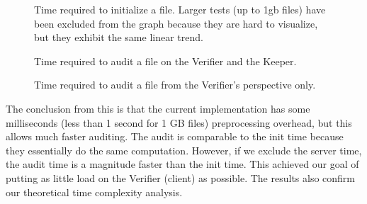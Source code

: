 \begin{figure}
  \myfloatalign
  \caption[]{Time required to initialize a file. Larger tests (up to 1gb files) have been excluded from the graph because they are hard to visualize, but they exhibit the same linear trend.}
  \label{fig:pretty-graph}
\end{figure}

\begin{figure}
  \myfloatalign
  \caption[]{Time required to audit a file on the Verifier and the Keeper.}
  \label{fig:pretty-graph}
\end{figure}

\begin{figure}
  \myfloatalign
  \caption[]{Time required to audit a file from the Verifier's perspective only.}
  \label{fig:pretty-graph}
\end{figure}

The conclusion from this is that the current implementation has some milliseconds (less than 1 second for 1 GB files) preprocessing overhead, but this allows much faster auditing.
The audit is comparable to the init time because they essentially do the same computation.
However, if we exclude the server time, the audit time is a magnitude faster than the init time.
This achieved our goal of putting as little load on the Verifier (client) as possible.
The results also confirm our theoretical time complexity analysis.

